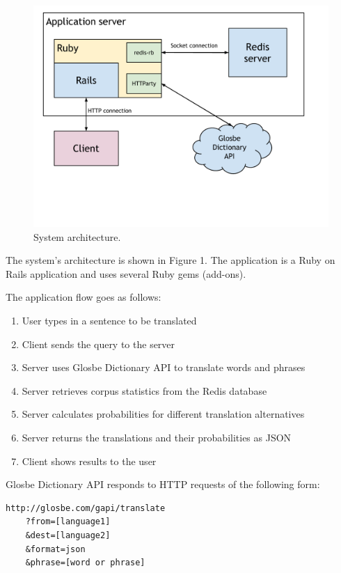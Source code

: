 \documentclass[12pt]{article}
\begin{document}
\begin{center}
\begin{figure}[h!]
\includegraphics[scale=0.7]{images/arc.pdf}
\caption{System architecture.}
\label{fig:arc}
\end{figure}
\end{center}

The system's architecture is shown in Figure 1.
The application is a Ruby on Rails application and uses several Ruby gems (add-ons).


The application flow goes as follows:
\begin{enumerate}
	\item User types in a sentence to be translated
	\item Client sends the query to the server
	\item Server uses Glosbe Dictionary API to translate words and phrases
	\item Server retrieves corpus statistics from the Redis database
	\item Server calculates probabilities for different translation alternatives
	\item Server returns the translations and their probabilities as JSON
	\item Client shows results to the user
\end{enumerate}


Glosbe Dictionary API responds to HTTP requests of the following form:
\begin{verbatim}
http://glosbe.com/gapi/translate
	?from=[language1]
	&dest=[language2]
	&format=json
	&phrase=[word or phrase]
\end{verbatim}
\end{document}
